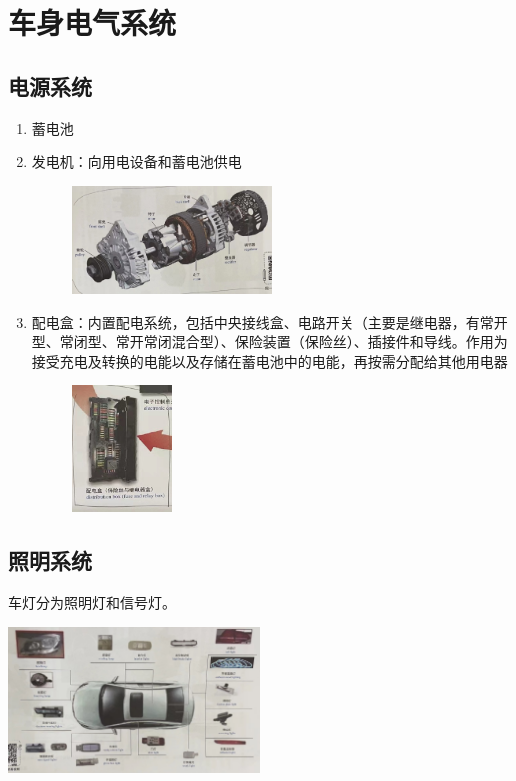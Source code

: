\section{车身电气系统}
\subsection{电源系统}
	\begin{enumerate}
		\item 蓄电池
		
		\item 发电机：向用电设备和蓄电池供电
			\begin{figure}[htbp]
				\centering
				\includegraphics[width=0.5\textwidth]{5-15}
			\end{figure}
			
		\item 配电盒：内置配电系统，包括中央接线盒、电路开关（主要是继电器，有常开型、常闭型、常开常闭混合型）、保险装置（保险丝）、插接件和导线。作用为接受充电及转换的电能以及存储在蓄电池中的电能，再按需分配给其他用电器
			\begin{figure}[htbp]
				\centering
				\includegraphics[width=0.25\textwidth]{5-16}
			\end{figure}
	\end{enumerate}

\subsection{照明系统}
	车灯分为照明灯和信号灯。
	\begin{center}
		\includegraphics[width=0.5\textwidth]{5-17}
	\end{center}

